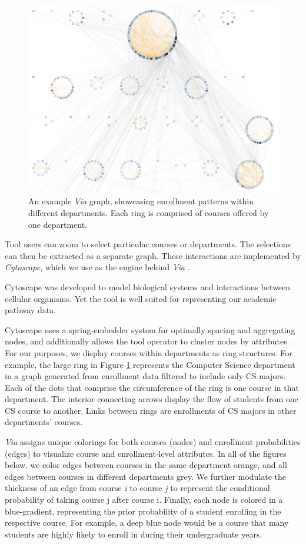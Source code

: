 \begin{figure}
    \centering
    \includegraphics[width=\columnwidth]{Figs/final-overview.pdf}
    \caption{An example {\em Via} graph, showcasing enrollment
      patterns within different departments. Each ring is comprised of
      courses offered by one department.}
    \label{fig:overview}
\end{figure}
Tool users can zoom to select particular courses or
departments. The selections can then be extracted as a separate
graph. These interactions are implemented by \textit{Cytoscape}, which
we use as the engine behind {\em Via} \cite{shannon2003cytoscape}.

Cytoscape was developed to model biological systems and interactions
between cellular organisms. Yet the tool is well suited for
representing our academic pathway data.

Cytoscape uses a spring-embedder system for optimally spacing and
aggregating nodes, and additionally allows the tool operator to
cluster nodes by attributes \cite{Battista1994}. For our purposes, we
display courses within departments as ring structures. For example,
the large ring in Figure \ref{fig:overview} represents the Computer
Science department in a graph generated from enrollment data filtered
to include only CS majors. Each of the dots that comprise the
circumference of the ring is one course in that department. The
interior connecting arrows display the flow of students from one CS
course to another. Links between rings are enrollments of CS majors in
other departments' courses.

{\em Via} assigns unique colorings for both courses (nodes) and
enrollment probabilities (edges) to visualize course and
enrollment-level attributes. In all of the figures below, we color
edges between courses in the same department orange, and all edges
between courses in different departments grey. We further modulate the
thickness of an edge from course \textit{i} to course \textit{j} to
represent the conditional probability of taking course j after course
i. Finally, each node is colored in a blue-gradient, representing the
prior probability of a student enrolling in the respective course. For
example, a deep blue node would be a course that many students are
highly likely to enroll in during their undergraduate years.

